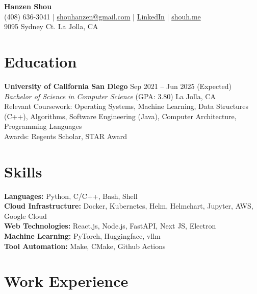 \documentclass[a4paper,10pt]{article}
\begin{document}
\begin{center}
    {\Huge \textbf{Hanzen Shou}} \\
    (408) 636-3041 | \href{mailto:shouhanzen@gmail.com}{shouhanzen@gmail.com} | \href{https://www.linkedin.com/in/hanzen-shou-36b130183/}{LinkedIn} | \href{http://shouh.me}{shouh.me} \\
    9095 Sydney Ct. La Jolla, CA
\end{center}

\vspace{1em}

\section*{Education}
\textbf{University of California San Diego} \hfill Sep 2021 -- Jun 2025 (Expected) \\
\textit{Bachelor of Science in Computer Science} (GPA: 3.80) \hfill La Jolla, CA \\
Relevant Coursework: Operating Systems, Machine Learning, Data Structures (C++), Algorithms, Software Engineering (Java), Computer Architecture, Programming Languages \\
Awards: Regents Scholar, STAR Award

\vspace{1em}

\section*{Skills}
\textbf{Languages:} Python, C/C++, Bash, Shell \\
\textbf{Cloud Infrastructure:} Docker, Kubernetes, Helm, Helmchart, Jupyter, AWS, Google Cloud \\
\textbf{Web Technologies:} React.js, Node.js, FastAPI, Next JS, Electron \\
\textbf{Machine Learning:} PyTorch, Huggingface, vllm \\
\textbf{Tool Automation:} Make, CMake, Github Actions

\vspace{1em}

\section*{Work Experience}
\end{document}

